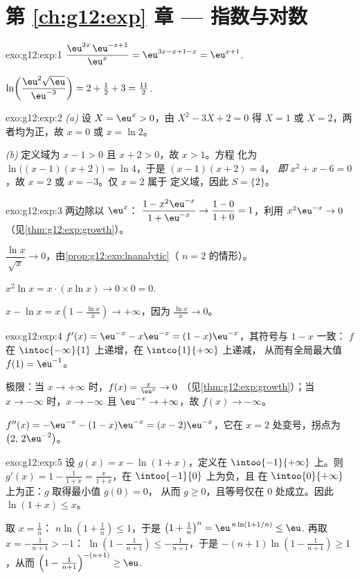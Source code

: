 \section*{第 \ref{ch:g12:exp} 章 --- 指数与对数}

\begin{solution}{exo:g12:exp:1}
$\dfrac{\eu^{3x}\,\eu^{-x+1}}{\eu^{x}} = \eu^{3x - x + 1 - x} = \eu^{x+1}$.

$\ln\!\left(\dfrac{\eu^2\sqrt{\eu}}{\eu^{-3}}\right)
= 2 + \tfrac12 + 3 = \tfrac{11}{2}$.
\end{solution}

\begin{solution}{exo:g12:exp:2}
\emph{(a)} 设 $X = \eu^x > 0$，由 $X^2 - 3X + 2 = 0$ 得
$X = 1$ 或 $X = 2$，两者均为正，故 $x = 0$ 或 $x = \ln 2$。

\emph{(b)} 定义域为 $x - 1 > 0$ 且 $x + 2 > 0$，故 $x > 1$。方程
化为 $\ln\bigl((x-1)(x+2)\bigr) = \ln 4$，于是 $(x-1)(x+2) = 4$，
\emph{即} $x^2 + x - 6 = 0$，故 $x = 2$ 或 $x = -3$。仅 $x = 2$ 属于
定义域，因此 $S = \{2\}$。
\end{solution}

\begin{solution}{exo:g12:exp:3}
两边除以 $\eu^x$：
$\dfrac{1 - x^2\eu^{-x}}{1 + \eu^{-x}} \to \dfrac{1-0}{1+0} = 1$，利用
$x^2 \eu^{-x} \to 0$（见\cref{thm:g12:exp:growth}）。

$\dfrac{\ln x}{\sqrt x} \to 0$，由\cref{prop:g12:exp:lnanalytic}（
$n = 2$ 的情形）。

$x^2 \ln x = x \cdot (x \ln x) \to 0 \times 0 = 0$.

$x - \ln x = x\left(1 - \frac{\ln x}{x}\right) \to +\infty$，因为
$\frac{\ln x}{x} \to 0$。
\end{solution}

\begin{solution}{exo:g12:exp:4}
$f'(x) = \eu^{-x} - x\eu^{-x} = (1 - x)\eu^{-x}$，其符号与 $1 - x$ 一致：
$f$ 在 $\intoc{-\infty}{1}$ 上递增，在 $\intco{1}{+\infty}$ 上递减，
从而有全局最大值 $f(1) = \eu^{-1}$。

极限：当 $x \to +\infty$ 时，$f(x) = \frac{x}{\eu^x} \to 0$
（见\cref{thm:g12:exp:growth}）；当 $x \to -\infty$ 时，$x \to -\infty$ 且
$\eu^{-x} \to +\infty$，故 $f(x) \to -\infty$。

$f''(x) = -\eu^{-x} - (1-x)\eu^{-x} = (x - 2)\eu^{-x}$，它在
$x = 2$ 处变号，拐点为 $\bigl(2,\, 2\eu^{-2}\bigr)$。
\end{solution}

\begin{solution}{exo:g12:exp:5}
设 $g(x) = x - \ln(1+x)$，定义在 $\intoo{-1}{+\infty}$ 上。则
$g'(x) = 1 - \frac{1}{1+x} = \frac{x}{1+x}$，在 $\intoo{-1}{0}$ 上为负，且
在 $\intoo{0}{+\infty}$ 上为正：$g$ 取得最小值 $g(0) = 0$，
从而 $g \geq 0$，且等号仅在 $0$ 处成立。因此 $\ln(1+x) \leq x$。

取 $x = \frac1n$：
$n\ln\left(1 + \frac1n\right) \leq 1$，于是
$\left(1+\frac1n\right)^n = \eu^{\,n\ln(1+1/n)} \leq \eu$.
再取 $x = -\frac{1}{n+1} > -1$：
$\ln\left(1 - \frac{1}{n+1}\right) \leq -\frac{1}{n+1}$，于是
$-(n+1)\ln\left(1 - \frac{1}{n+1}\right) \geq 1$，从而
$\left(1 - \frac{1}{n+1}\right)^{-(n+1)} \geq \eu$.
\end{solution}

